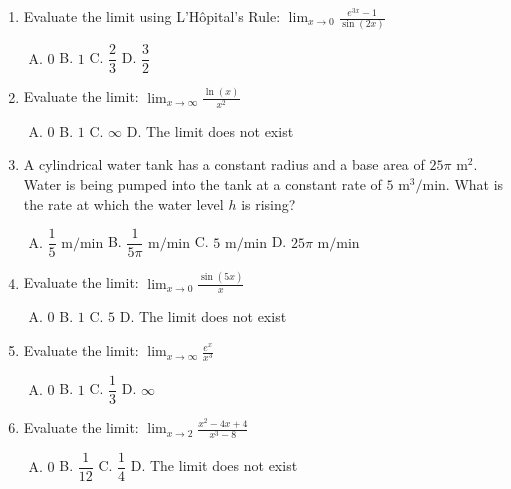 \documentclass[11pt,a4paper]{article}
\begin{document}
\begin{enumerate}[1.]
    \item Evaluate the limit using L'H\^{o}pital's Rule: $\displaystyle \lim_{x \to 0} \frac{e^{3x} - 1}{\sin(2x)}$
    \begin{enumerate}[A.]
        \item $0$ \qquad B. $1$ \qquad C. $\dfrac{2}{3}$ \qquad D. $\dfrac{3}{2}$
    \end{enumerate}

    \item Evaluate the limit: $\displaystyle \lim_{x \to \infty} \frac{\ln(x)}{x^2}$
    \begin{enumerate}[A.]
        \item $0$ \qquad B. $1$ \qquad C. $\infty$ \qquad D. The limit does not exist
    \end{enumerate}

    \item A cylindrical water tank has a constant radius and a base area of $25\pi\text{ m}^2$. Water is being pumped into the tank at a constant rate of $5\text{ m}^3/\text{min}$. What is the rate at which the water level $h$ is rising?
    \begin{enumerate}[A.]
        \item $\dfrac{1}{5}\text{ m/min}$ \qquad B. $\dfrac{1}{5\pi}\text{ m/min}$ \qquad C. $5\text{ m/min}$ \qquad D. $25\pi\text{ m/min}$
    \end{enumerate}

    \item Evaluate the limit: $\displaystyle \lim_{x \to 0} \frac{\sin(5x)}{x}$
    \begin{enumerate}[A.]
        \item $0$ \qquad B. $1$ \qquad C. $5$ \qquad D. The limit does not exist
    \end{enumerate}

    \item Evaluate the limit: $\displaystyle \lim_{x \to \infty} \frac{e^x}{x^3}$
    \begin{enumerate}[A.]
        \item $0$ \qquad B. $1$ \qquad C. $\dfrac{1}{3}$ \qquad D. $\infty$
    \end{enumerate}

    \item Evaluate the limit: $\displaystyle \lim_{x \to 2} \frac{x^2 - 4x + 4}{x^3 - 8}$
    \begin{enumerate}[A.]
        \item $0$ \qquad B. $\dfrac{1}{12}$ \qquad C. $\dfrac{1}{4}$ \qquad D. The limit does not exist
    \end{enumerate}


\end{enumerate}
\end{document}
